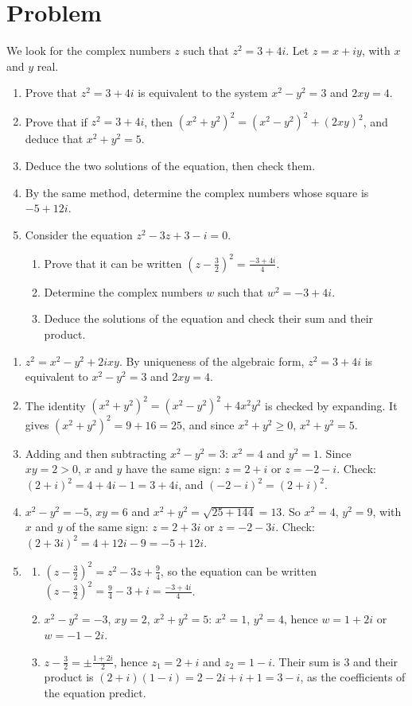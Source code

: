 \mxnewpage
\section{Problem}
\begin{problem}
We look for the complex numbers $z$ such that $z^2=3+4i$. Let $z=x+iy$, with $x$ and $y$ real.
\begin{enumerate}
\item Prove that $z^2=3+4i$ is equivalent to the system $x^2-y^2=3$ and $2xy=4$.
\item Prove that if $z^2=3+4i$, then $\left(x^2+y^2\right)^2=\left(x^2-y^2\right)^2+(2xy)^2$, and deduce that $x^2+y^2=5$.
\item Deduce the two solutions of the equation, then check them.
\item By the same method, determine the complex numbers whose square is $-5+12i$.
\item Consider the equation $z^2-3z+3-i=0$.
\begin{enumerate}
\item Prove that it can be written $\left(z-\frac32\right)^2=\frac{-3+4i}{4}$.
\item Determine the complex numbers $w$ such that $w^2=-3+4i$.
\item Deduce the solutions of the equation and check their sum and their product.
\end{enumerate}
\end{enumerate}
\end{problem}
\begin{solution}[Problem]
\begin{enumerate}
\item $z^2=x^2-y^2+2ixy$. By uniqueness of the algebraic form, $z^2=3+4i$ is equivalent to $x^2-y^2=3$ and $2xy=4$.
\item The identity $\left(x^2+y^2\right)^2=\left(x^2-y^2\right)^2+4x^2y^2$ is checked by expanding. It gives $\left(x^2+y^2\right)^2=9+16=25$, and since $x^2+y^2\ge0$, $x^2+y^2=5$.
\item Adding and then subtracting $x^2-y^2=3$: $x^2=4$ and $y^2=1$. Since $xy=2>0$, $x$ and $y$ have the same sign: $z=2+i$ or $z=-2-i$. Check: $(2+i)^2=4+4i-1=3+4i$, and $(-2-i)^2=(2+i)^2$.
\item $x^2-y^2=-5$, $xy=6$ and $x^2+y^2=\sqrt{25+144}=13$. So $x^2=4$, $y^2=9$, with $x$ and $y$ of the same sign: $z=2+3i$ or $z=-2-3i$. Check: $(2+3i)^2=4+12i-9=-5+12i$.
\item
\begin{enumerate}
\item $\left(z-\frac32\right)^2=z^2-3z+\frac94$, so the equation can be written $\left(z-\frac32\right)^2=\frac94-3+i=\frac{-3+4i}{4}$.
\item $x^2-y^2=-3$, $xy=2$, $x^2+y^2=5$: $x^2=1$, $y^2=4$, hence $w=1+2i$ or $w=-1-2i$.
\item $z-\frac32=\pm\frac{1+2i}{2}$, hence $z_1=2+i$ and $z_2=1-i$. Their sum is $3$ and their product is $(2+i)(1-i)=2-2i+i+1=3-i$, as the coefficients of the equation predict.
\end{enumerate}
\end{enumerate}
\end{solution}
